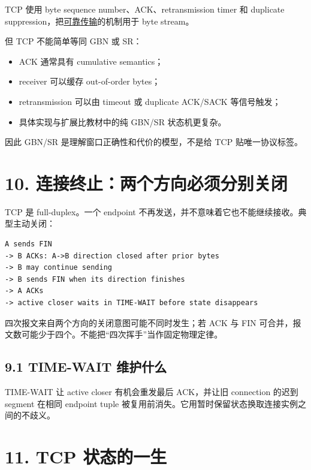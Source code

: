 \documentclass[UTF8,fontset=none,11pt,a4paper]{ctexart}
\providecommand{\tightlist}{\setlength{\itemsep}{0pt}\setlength{\parskip}{0pt}}
\begin{document}
TCP 使用 byte sequence number、ACK、retransmission timer 和 duplicate
suppression，把\href{../03_可靠传输_序号_ACK_定时器与滑动窗口/README.md}{可靠传输}的机制用于
byte stream。

但 TCP 不能简单等同 GBN 或 SR：

\begin{itemize}
\tightlist
\item
  ACK 通常具有 cumulative semantics；
\item
  receiver 可以缓存 out-of-order bytes；
\item
  retransmission 可以由 timeout 或 duplicate ACK/SACK 等信号触发；
\item
  具体实现与扩展比教材中的纯 GBN/SR 状态机更复杂。
\end{itemize}

因此 GBN/SR 是理解窗口正确性和代价的模型，不是给 TCP 贴唯一协议标签。

\section{10.
连接终止：两个方向必须分别关闭}\label{9-ux8fdeux63a5ux7ec8ux6b62ux4e24ux4e2aux65b9ux5411ux5fc5ux987bux5206ux522bux5173ux95ed}

TCP 是 full-duplex。一个 endpoint
不再发送，并不意味着它也不能继续接收。典型主动关闭：

\begin{lstlisting}
A sends FIN
-> B ACKs: A->B direction closed after prior bytes
-> B may continue sending
-> B sends FIN when its direction finishes
-> A ACKs
-> active closer waits in TIME-WAIT before state disappears
\end{lstlisting}

四次报文来自两个方向的关闭意图可能不同时发生；若 ACK 与 FIN
可合并，报文数可能少于四个。不能把``四次挥手''当作固定物理定律。

\subsection{9.1 TIME-WAIT
维护什么}\label{91-time-wait-ux7ef4ux62a4ux4ec0ux4e48}

TIME-WAIT 让 active closer 有机会重发最后 ACK，并让旧 connection 的迟到
segment 在相同 endpoint tuple
被复用前消失。它用暂时保留状态换取连接实例之间的不歧义。

\section{11. TCP
状态的一生}\label{10-tcp-ux72b6ux6001ux7684ux4e00ux751f}
\end{document}
